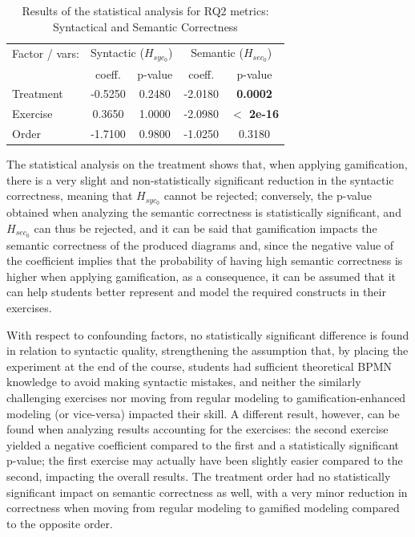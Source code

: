 \begin{table}[ht]
  \centering
  \footnotesize
  \caption{Results of the statistical analysis for RQ2 metrics: Syntactical and Semantic Correctness}
  \label{tab:tabrq2_anova}
    \begin{tabular}{lcccc}
         \toprule
         Factor / vars:& 
         \multicolumn{2}{c}{Syntactic (${H_{syc_{0}}}$)} & \multicolumn{2}{c}{Semantic (${H_{sec_{0}}}$)} \\
         & coeff. & p-value & coeff. & p-value \\
         \midrule
         Treatment & -0.5250 &	0.2480 &	-2.0180 & 	\textbf{0.0002}\\
         Exercise & 0.3650 &	1.0000 &	-2.0980 &	\textbf{$\lt$ 2e-16} \\
         Order & -1.7100	& 0.9800 	& -1.0250 &	0.3180 \\
         \bottomrule
    \end{tabular}
\end{table}

The statistical analysis on the treatment shows that, when applying gamification, there is a very slight and non-statistically significant reduction in the syntactic correctness, meaning that ${H_{syc_{0}}}$ cannot be rejected; conversely, the p-value obtained when analyzing the semantic correctness is statistically significant, and ${H_{sec_{0}}}$ can thus be rejected, and it can be said that gamification impacts the semantic correctness of the produced diagrams and, since the negative value of the coefficient implies that the probability of having high semantic correctness is higher when applying gamification, as a consequence, it can be assumed that it can help students better represent and model the required constructs in their exercises.

With respect to confounding factors, no statistically significant difference is found in relation to syntactic quality, strengthening the assumption that, by placing the experiment at the end of the course, students had sufficient theoretical BPMN knowledge to avoid making syntactic mistakes, and neither the similarly challenging exercises nor moving from regular modeling to gamification-enhanced modeling (or vice-versa) impacted their skill. A different result, however, can be found when analyzing results accounting for the exercises: the second exercise yielded a negative coefficient compared to the first and a statistically significant p-value; the first exercise may actually have been slightly easier compared to the second, impacting the overall results. The treatment order had no statistically significant impact on semantic correctness as well, with a very minor reduction in correctness when moving from regular modeling to gamified modeling compared to the opposite order.

